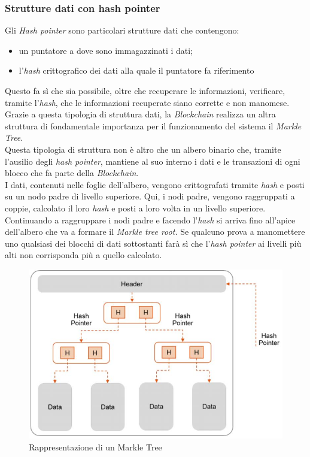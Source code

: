 \subsubsection{Strutture dati con hash pointer}
Gli \textit{Hash pointer} sono particolari strutture dati che contengono:
\begin{itemize}
	\item un puntatore a dove sono immagazzinati i dati;
	\item l'\textit{hash} crittografico dei dati alla quale il puntatore fa riferimento
\end{itemize}
Questo fa sì che sia possibile, oltre che recuperare le informazioni, verificare, tramite l'\textit{hash}, che le informazioni recuperate siano corrette e non manomese.\\
Grazie a questa tipologia di struttura dati, la \textit{Blockchain} realizza un altra struttura di fondamentale importanza per il funzionamento del sistema il \textit{Markle Tree}.\\
Questa tipologia di struttura non è altro che un albero binario che, tramite l'ausilio degli \textit{hash pointer}, mantiene al suo interno i dati e le transazioni di ogni blocco che fa parte della \textit{Blockchain}.\\
I dati, contenuti nelle foglie dell'albero, vengono crittografati tramite \textit{hash} e posti su un nodo padre di livello superiore. Qui, i nodi padre, vengono raggruppati a coppie, calcolato il loro \textit{hash} e posti a loro volta in un livello superiore. 
Continuando a raggruppare i nodi padre e facendo l'\textit{hash} si arriva fino all'apice dell'albero che va a formare il \textit{Markle tree root.}
Se qualcuno prova a manomettere uno qualsiasi dei blocchi di dati sottostanti farà sì che l'\textit{hash pointer} ai livelli più alti non corrisponda più a quello calcolato.
\begin{figure}[!h]
	\centering
	\includegraphics[scale=0.50]{immagini/markle_tree}
	\caption{Rappresentazione di un Markle Tree}
\end{figure} 
